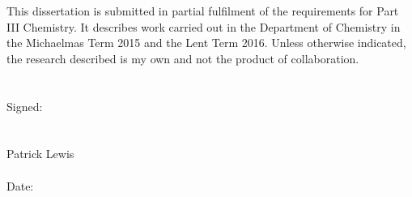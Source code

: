 
This dissertation is submitted in partial fulfilment of the requirements for Part III Chemistry. It describes work carried out in the Department of Chemistry in the Michaelmas Term 2015 and the Lent Term 2016. Unless otherwise indicated, the research described is my own and not the product of collaboration.
\\
\\
\\
Signed:
\\
\\
\\
\-\hspace{2cm} Patrick Lewis
\\
\\
Date:
